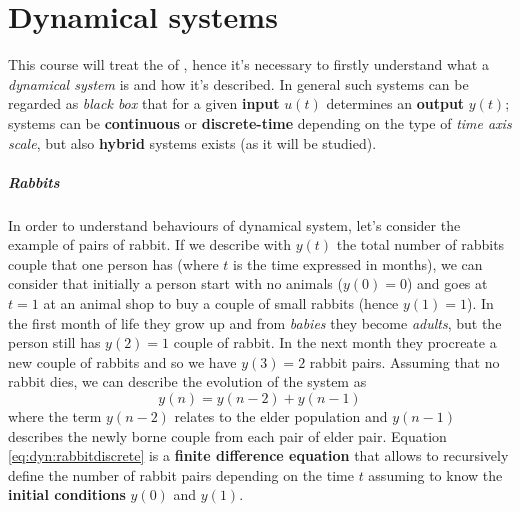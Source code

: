 \chapter{Dynamical systems}

	This course will treat the  of , hence it's necessary to firstly understand what a \textit{dynamical system} is and how it's described. In general such systems can be regarded as \textit{black box} that for a given \textbf{input} $u(t)$ determines an \textbf{output} $y(t)$; systems can be \textbf{continuous} or \textbf{discrete-time} depending on the type of \textit{time axis scale}, but also \textbf{hybrid} systems exists (as it will be studied).
	
	\paragraph{Rabbits} In order to understand behaviours of dynamical system, let's consider the example of pairs of rabbit. If we describe with $y(t)$ the total number of rabbits couple that one person has (where $t$ is the time expressed in months), we can consider that initially a person start with no animals ($y(0) = 0$) and goes at $t=1$ at an animal shop to buy a couple of small rabbits (hence $y(1) = 1$). In the first month of life they grow up and from \textit{babies} they become \textit{adults}, but the person still has $y(2) = 1$ couple of rabbit. In the next month they procreate a new couple of rabbits and so we have $y(3) = 2$ rabbit pairs. Assuming that no rabbit dies, we can describe the evolution of the system as
	\begin{equation} \label{eq:dyn:rabbitdiscrete}
		y(n) = y(n-2) + y(n-1)
	\end{equation}
	where the term $y(n-2)$ relates to the elder population and $y(n-1)$ describes the newly borne couple from each pair of elder pair. Equation \ref{eq:dyn:rabbitdiscrete} is a \textbf{finite difference equation} that allows to recursively define the number of rabbit pairs depending on the time $t$ assuming to know the \textbf{initial conditions} $y(0)$ and $y(1)$.
	
